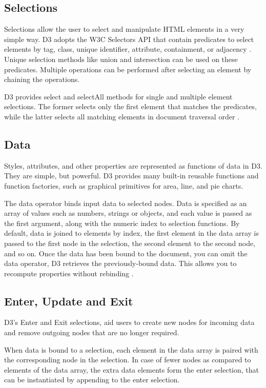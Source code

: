 \documentclass[9pt,twocolumn,twoside]{../../styles/osajnl}
\begin{document}
\subsection{Selections}
Selections allow the user to select and manipulate HTML elements in a very simple way. D3 adopts the W3C Selectors API that contain predicates to select elements by tag, class, unique identifier, attribute, containment, or adjacency \cite{www-d3}. Unique selection methods like union and intersection can be used on these predicates. Multiple operations can be performed after selecting an element by chaining the operations. 

D3 provides select and selectAll methods for single and multiple element selections. The former selects only the first element that matches the predicates, while the latter selects all matching elements in document traversal order \cite{paper-d3}.

   
    
\subsection{Data}
Styles, attributes, and other properties are represented as functions of data in D3. They are simple, but powerful. D3 provides many built-in reusable functions and function factories, such as graphical primitives for area, line, and pie charts.

The data operator binds input data to selected nodes. Data is specified as an array of values such as numbers, strings or objects, and each value is passed as the first argument, along with the numeric index to selection functions. By default, data is joined to elements by index, the first element in the data array is passed to the first node in the selection, the second element to the second node, and so on. Once the data has been bound to the document, you can omit the data operator, D3 retrieves the previously-bound data. This allows you to recompute properties without rebinding \cite{www-d3}.

   
    
\subsection{Enter, Update and Exit}
D3’s Enter and Exit selections, aid users to create new nodes for incoming data and remove outgoing nodes that are no longer required.

When data is bound to a selection, each element in the data array is paired with the corresponding node in the selection. In case of fewer nodes as compared to elements of the data array, the extra data elements form the enter selection, that can be instantiated by appending to the enter selection. 
\end{document}
